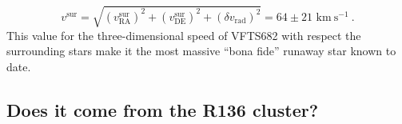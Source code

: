 \documentclass{aa}
\newcommand{\todo}[1]{{\large $\blacksquare$~\textbf{\color{red}[#1]}}~$\blacksquare$}
\newcommand{\kms}{{\,\mathrm{km\ s^{-1}}}}
\DeclareRobustCommand{\Eqref}[1]{Eq.~\ref{#1}}
\DeclareRobustCommand{\Figref}[1]{Fig.~\ref{#1}}
\DeclareRobustCommand{\Tabref}[1]{Table~\ref{#1}}
\DeclareRobustCommand{\Secref}[1]{Sec.~\ref{#1}}
\begin{document}
\begin{equation}
  \label{eq:speed_around}
  v^\mathrm{sur} = \sqrt{\left(v^\mathrm{sur}_\mathrm{RA}\right)^2
    +\left(v^\mathrm{sur}_\mathrm{DE}\right)^2+\left(\delta
      v_\mathrm{rad}\right)^2} = 64 \pm 21 
  \, \kms \ .
\end{equation}
This value for the three-dimensional speed of VFTS682 with respect the
surrounding stars make it the most massive ``bona fide'' runaway star
known to date.

\subsection{Does it come from the R136 cluster?}
\label{sec:r136_origin}



\end{document}
